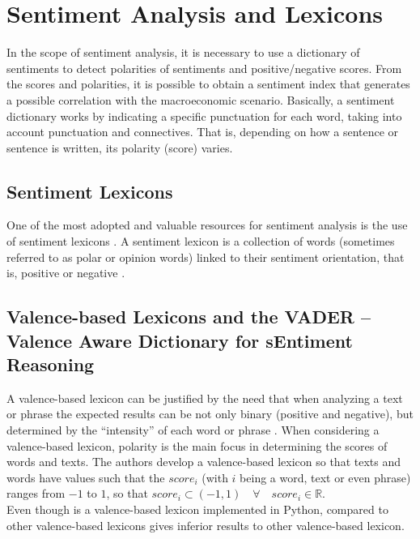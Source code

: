 \section{Sentiment Analysis and Lexicons}

In the scope of sentiment analysis, it is necessary to use a dictionary of sentiments to detect polarities of sentiments and positive/negative scores. From the scores and polarities, it is possible to obtain a sentiment index that generates a possible correlation with the macroeconomic scenario. Basically, a sentiment dictionary works by indicating a specific punctuation for each word, taking into account punctuation and connectives. That is, depending on how a sentence or sentence is written, its polarity (score) varies.\\


\subsection{Sentiment Lexicons} \label{sec:lexicons}
One of the most adopted and valuable resources for sentiment analysis is the use of sentiment lexicons \cite[]{ahire2014survey, nusko2016building, cambria2013new, kaity2020sentiment}. A sentiment lexicon is a collection of words (sometimes referred to as polar or opinion words) linked to their sentiment orientation, that is, positive or negative \cite[]{kaity2020sentiment, medhat2014sentiment}.

\subsection{Valence-based Lexicons and the VADER – Valence Aware Dictionary for sEntiment Reasoning}

A valence-based lexicon can be justified by the need that when analyzing a text or phrase the expected results can be not only binary (positive and negative), but determined by the ``intensity'' of each word or phrase \cite[] {hutto2014vader}. When considering a valence-based lexicon, polarity is the main focus in determining the scores of \cite[]{cambria2012senticnet} words and texts. The authors develop a valence-based lexicon so that texts and words have values such that the $score_i$ (with $i$ being a word, text or even phrase) ranges from $-1$ to $1$, so that $ score_i \subset (-1, 1) \quad \forall \quad score_i \in \mathbb{R}$.\\

Even though \cite{cambria2020senticnet} is a valence-based lexicon implemented in Python, compared to other valence-based lexicons \cite[]{hutto2014vader} gives inferior results to other valence-based lexicon.\\


